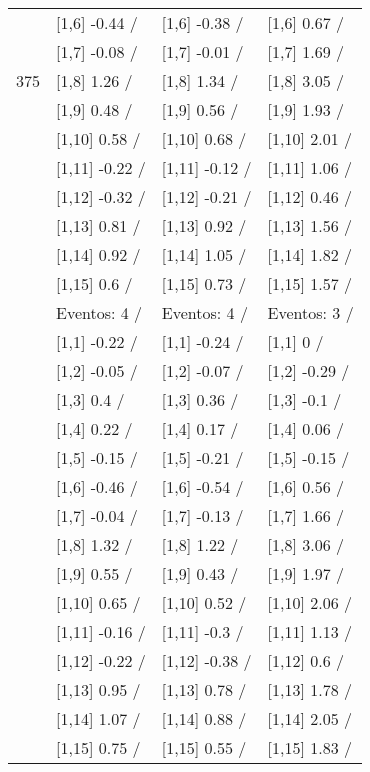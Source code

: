 \begin{table}
\begin{tabular}[t]{llll}
 & {}[1,6] -0.44  / & {}[1,6] -0.38  / & {}[1,6] 0.67  /\\
 & {}[1,7] -0.08  / & {}[1,7] -0.01  / & {}[1,7] 1.69  /\\
375 & {}[1,8] 1.26  / & {}[1,8] 1.34  / & {}[1,8] 3.05  /\\
\addlinespace
 & {}[1,9] 0.48  / & {}[1,9] 0.56  / & {}[1,9] 1.93  /\\
 & {}[1,10] 0.58  / & {}[1,10] 0.68  / & {}[1,10] 2.01  /\\
 & {}[1,11] -0.22  / & {}[1,11] -0.12  / & {}[1,11] 1.06  /\\
 & {}[1,12] -0.32  / & {}[1,12] -0.21  / & {}[1,12] 0.46  /\\
 & {}[1,13] 0.81  / & {}[1,13] 0.92  / & {}[1,13] 1.56  /\\
\addlinespace
 & {}[1,14] 0.92  / & {}[1,14] 1.05  / & {}[1,14] 1.82  /\\
 & {}[1,15] 0.6  / & {}[1,15] 0.73  / & {}[1,15] 1.57  /\\
 & Eventos:  4 / & Eventos:  4 / & Eventos:  3 /\\
 & {}[1,1] -0.22  / & {}[1,1] -0.24  / & {}[1,1] 0  /\\
 & {}[1,2] -0.05  / & {}[1,2] -0.07  / & {}[1,2] -0.29  /\\
\addlinespace
 & {}[1,3] 0.4  / & {}[1,3] 0.36  / & {}[1,3] -0.1  /\\
 & {}[1,4] 0.22  / & {}[1,4] 0.17  / & {}[1,4] 0.06  /\\
 & {}[1,5] -0.15  / & {}[1,5] -0.21  / & {}[1,5] -0.15  /\\
 & {}[1,6] -0.46  / & {}[1,6] -0.54  / & {}[1,6] 0.56  /\\
 & {}[1,7] -0.04  / & {}[1,7] -0.13  / & {}[1,7] 1.66  /\\
\addlinespace
500 & {}[1,8] 1.32  / & {}[1,8] 1.22  / & {}[1,8] 3.06  /\\
 & {}[1,9] 0.55  / & {}[1,9] 0.43  / & {}[1,9] 1.97  /\\
 & {}[1,10] 0.65  / & {}[1,10] 0.52  / & {}[1,10] 2.06  /\\
 & {}[1,11] -0.16  / & {}[1,11] -0.3  / & {}[1,11] 1.13  /\\
 & {}[1,12] -0.22  / & {}[1,12] -0.38  / & {}[1,12] 0.6  /\\
\addlinespace
 & {}[1,13] 0.95  / & {}[1,13] 0.78  / & {}[1,13] 1.78  /\\
 & {}[1,14] 1.07  / & {}[1,14] 0.88  / & {}[1,14] 2.05  /\\
 & {}[1,15] 0.75  / & {}[1,15] 0.55  / & {}[1,15] 1.83  /\\
\bottomrule
\end{tabular}
\end{table}
